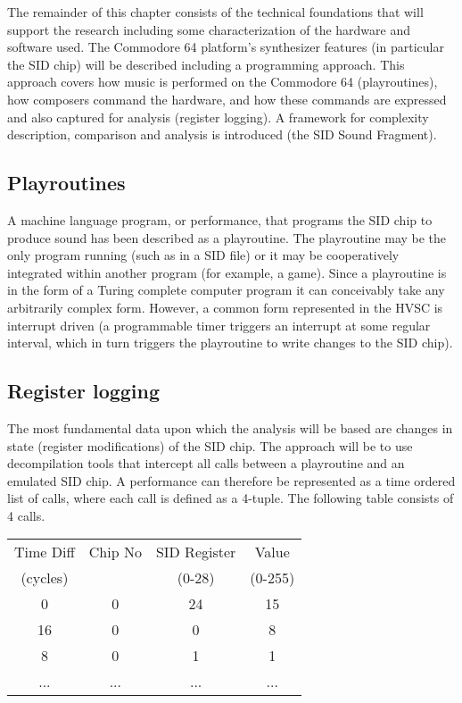 \documentclass[10pt]{article}
\begin{document}
\begin{multicols*}{2}
The remainder of this chapter consists of the technical foundations that will support the research including some characterization of the hardware and software used. The Commodore 64 platform’s synthesizer features (in particular the SID chip) will be described including a programming approach. This approach covers how music is performed on the Commodore 64 (playroutines), how composers command the hardware, and how these commands are expressed and also captured for analysis (register logging). A framework for complexity description, comparison and analysis is introduced (the SID Sound Fragment).

\subsection{Playroutines}

A machine language program, or performance, that programs the SID chip to produce sound has been described as a playroutine. The playroutine may be the only program running (such as in a SID file) or it may be cooperatively integrated within another program (for example, a game). Since a playroutine is in the form of a Turing complete computer program it can conceivably take any arbitrarily complex form. However, a common form represented in the HVSC is interrupt driven (a programmable timer triggers an interrupt at some regular interval, which in turn triggers the playroutine to write changes to the SID chip).

\subsection{Register logging}

The most fundamental data upon which the analysis will be based are changes in state (register modifications) of the SID chip. The approach will be to use decompilation tools that intercept all calls between a playroutine and an emulated SID chip. A performance can therefore be represented as a time ordered list of calls, where each call is defined as a 4-tuple. The following table consists of 4 calls.

    \begin{tabular}{|c|c|c|c|}
        \hline
        \rule[-1ex]{0pt}{2.5ex} Time Diff & Chip No & SID Register & Value \\
        \rule[-1ex]{0pt}{2.5ex} (cycles) & & (0-28) & (0-255) \\
        \hline
        \rule[-1ex]{0pt}{2.5ex} 0 & 0 & 24 & 15 \\
        \hline
        \rule[-1ex]{0pt}{2.5ex} 16 & 0 & 0 & 8 \\
        \hline
        \rule[-1ex]{0pt}{2.5ex} 8 & 0 & 1 & 1 \\
        \hline
        \rule[-1ex]{0pt}{2.5ex} ... & ... & ... & ... \\
        \hline
    \end{tabular}


\end{multicols*}
\end{document}
